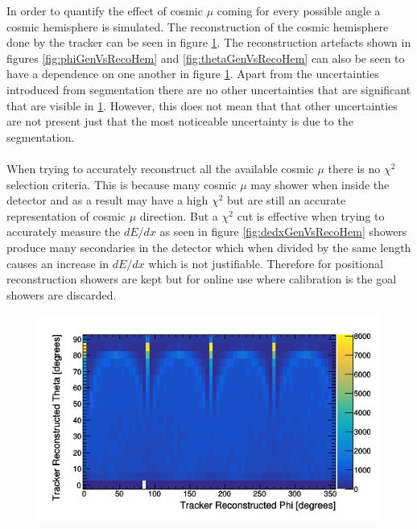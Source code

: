 In order to quantify the effect of cosmic $\mu$ coming for every possible angle a cosmic hemisphere is simulated. The reconstruction of the cosmic hemisphere done by the tracker can be seen in figure \ref{fig:simulatedHemisphereDist}. The reconstruction artefacts shown in figures \ref{fig:phiGenVsRecoHem} and \ref{fig:thetaGenVsRecoHem} can also be seen to have a dependence on one another in figure \ref{fig:simulatedHemisphereDist}. Apart from the uncertainties introduced from segmentation there are no other uncertainties that are significant that are visible in \ref{fig:simulatedHemisphereDist}. However, this does not mean that that other uncertainties are not present just that the most noticeable uncertainty is due to the segmentation. 
\\\\ When trying to accurately reconstruct all the available cosmic $\mu$ there is no $\chi^2$ selection criteria. This is because many cosmic $\mu$ may shower when inside the detector and as a result may have a high $\chi^2$ but are still an accurate representation of cosmic $\mu$ direction. But a $\chi^2$ cut is effective when trying to accurately measure the $dE/dx$ as seen in figure \ref{fig:dedxGenVsRecoHem} showers produce many secondaries in the detector which when divided by the same length causes an increase in $dE/dx$ which is not justifiable. Therefore for positional reconstruction showers are kept but for online use where calibration is the goal showers are discarded.

\begin{figure}[htbp]
 \centering
 \includegraphics[width=0.8\linewidth]{Chapter5/Figs/Raster/pvsTFiduicalHemisphere.png}
 \label{fig:simulatedHemisphereDist}
\end{figure}

